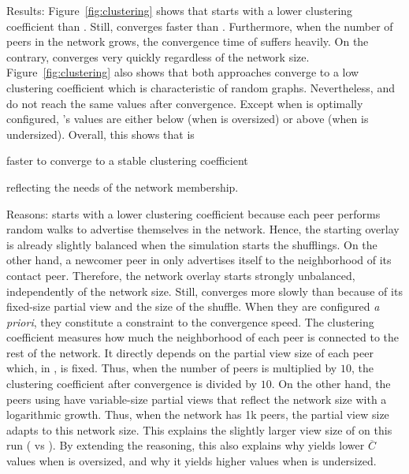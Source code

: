 \begin{asparadesc}
\item[Results:] Figure~\ref{fig:clustering} shows that \CYCLON starts
  with a lower clustering coefficient than \SPRAY. Still, \SPRAY
  converges faster than \CYCLON. Furthermore, when the number of peers
  in the network grows, the convergence time of \CYCLON suffers
  heavily. On the contrary, \SPRAY converges very quickly
  regardless of the network size. Figure~\ref{fig:clustering} also
  shows that both approaches converge to a low clustering coefficient
  which is characteristic of random graphs. Nevertheless, \CYCLON and
  \SPRAY do not reach the same values after convergence. Except when
  \CYCLON is optimally configured, \SPRAY's values are either below
  (when \CYCLON is oversized) or above (when \CYCLON is undersized).
  Overall, this shows that \SPRAY is
  \begin{inparaenum}
  \item faster to converge to a stable clustering coefficient
  \item reflecting the needs of the network membership.
  \end{inparaenum}
\item[Reasons:] \CYCLON starts with a lower clustering coefficient
  because each peer performs random walks to advertise themselves in
  the network. Hence, the starting overlay is already slightly
  balanced when the simulation starts the shufflings. On the other
  hand, a newcomer peer in \SPRAY only advertises itself to the
  neighborhood of its contact peer. Therefore, the network overlay
  starts strongly unbalanced, independently of the network
  size. Still, \CYCLON converges more slowly than \SPRAY because of
  its fixed-size partial view and the size of the shuffle. When they
  are configured \emph{a priori}, they constitute a constraint to the
  convergence speed.  The clustering coefficient measures how much the
  neighborhood of each peer is connected to the rest of the
  network. It directly depends on the partial view size of each peer
  which, in \CYCLON, is fixed. Thus, when the number of peers is
  multiplied by $10$, the clustering coefficient after convergence is
  divided by $10$. On the other hand, the peers using \SPRAY have
  variable-size partial views that reflect the network size with a
  logarithmic growth. Thus, when the network has 1k peers, the partial
  view size adapts to this network size. This explains the slightly
  larger view size of \SPRAY on this run ( vs ). By
  extending the reasoning, this also explains why \SPRAY yields lower
  $\overline{C}$ values when \CYCLON is oversized, and why it yields
  higher values when \CYCLON is undersized.
\end{asparadesc}

